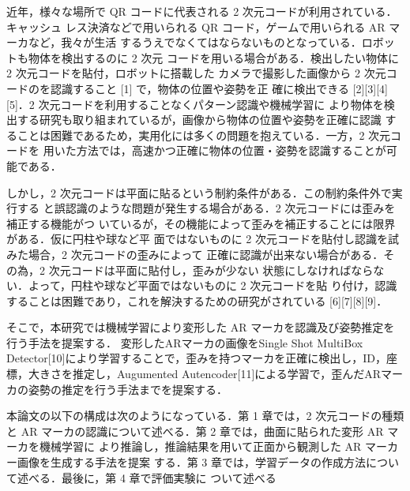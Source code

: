 近年，様々な場所で QR コードに代表される 2 次元コードが利用されている．キャッシュ
レス決済などで用いられる QR コード，ゲームで用いられる AR マーカなど，我々が生活
するうえでなくてはならないものとなっている．ロボットも物体を検出するのに 2 次元
コードを用いる場合がある．検出したい物体に 2 次元コードを貼付，ロボットに搭載した
カメラで撮影した画像から 2 次元コードのを認識すること [1] で，物体の位置や姿勢を正
確に検出できる [2][3][4][5]．2 次元コードを利用することなくパターン認識や機械学習に
より物体を検出する研究も取り組まれているが，画像から物体の位置や姿勢を正確に認識
することは困難であるため，実用化には多くの問題を抱えている．一方，2 次元コードを
用いた方法では，高速かつ正確に物体の位置・姿勢を認識することが可能である．

しかし，2 次元コードは平面に貼るという制約条件がある．この制約条件外で実行する
と誤認識のような問題が発生する場合がある．2 次元コードには歪みを補正する機能がつ
いているが，その機能によって歪みを補正することには限界がある．仮に円柱や球など平
面ではないものに 2 次元コードを貼付し認識を試みた場合，2 次元コードの歪みによって
正確に認識が出来ない場合がある．その為，2 次元コードは平面に貼付し，歪みが少ない
状態にしなければならない．よって，円柱や球など平面ではないものに 2 次元コードを貼
り付け，認識することは困難であり，これを解決するための研究がされている [6][7][8][9]．

そこで，本研究では機械学習により変形した AR マーカを認識及び姿勢推定を行う手法を提案する．
変形したARマーカの画像をSingle Shot MultiBox Detector[10]により学習することで，歪みを持つマーカを正確に検出し，ID，座標，大きさを推定し，Augumented Autencoder[11]による学習で，歪んだARマーカの姿勢の推定を行う手法までを提案する．

本論文の以下の構成は次のようになっている．第 1 章では，2 次元コードの種類と AR
マーカの認識について述べる．第 2 章では，曲面に貼られた変形 AR マーカを機械学習に
より推論し，推論結果を用いて正面から観測した AR マーカー画像を生成する手法を提案
する．第 3 章では，学習データの作成方法について述べる．最後に，第 4 章で評価実験に
ついて述べる